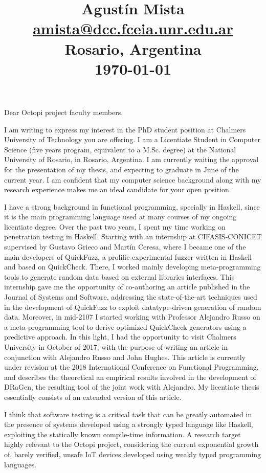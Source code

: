 \documentclass[helvetica,notitle,flagCMYK,totpages,11pt]{europecv}
\title{
  \begin{flushright}
    \Large{Agustín Mista}\\
    \small{\url{amista@dcc.fceia.unr.edu.ar}}\\
    \small{Rosario, Argentina}\\
    \small{\today}
  \end{flushright}
  \vspace{-50pt}
}
\date{}
\begin{document}
\maketitle 

Dear Octopi project faculty members,

I am writing to express my interest in the PhD student position at Chalmers
University of Technology you are offering.
%
I am a Licentiate Student in Computer Science (five years program, equivalent to
a M.Sc. degree) at the National University of Rosario, in Rosario, Argentina.
%
I am currently waiting the approval for the presentation of my thesis, and
expecting to graduate in June of the current year.
%
I am confident that my computer science background along with my research
experience makes me an ideal candidate for your open position.


I have a strong background in functional programming, specially in Haskell,
since it is the main programming language used at many courses of my ongoing
licentiate degree.
%
Over the past two years, I spent my time working on penetration testing in
Haskell. Starting with an internship at CIFASIS-CONICET supervised by Gustavo
Grieco and Martín Ceresa, where I became one of the main developers of
QuickFuzz, a prolific experimental fuzzer written in Haskell and based on
QuickCheck.
%
There, I worked mainly developing meta-programming tools to generate random data
based on external libraries interfaces.
%
This internship gave me the opportunity of co-authoring an article published in
the Journal of Systems and Software, addressing the state-of-the-art techniques
used in the development of QuickFuzz to exploit datatype-driven generation of
random data.
%
Moreover, in mid-2107 I started working with Professor Alejandro Russo on a
meta-programming tool to derive optimized QuickCheck generators using a
predictive approach.
%
In this light, I had the opportunity to visit Chalmers University in October of
2017, with the purpose of writing an article in conjunction with Alejandro Russo
and John Hughes.
%
This article is currently under revision at the 2018 International Conference on
Functional Programming, and describes the theoretical an empirical results
involved in the development of DRaGen, the resulting tool of the joint work with
Alejandro.
%
My licentiate thesis essentially consists of an extended version of this
article.


I think that software testing is a critical task that can be greatly automated
in the presence of systems developed using a strongly typed language like
Haskell, exploiting the statically known compile-time information.
%
A research target highly relevant to the Octopi project, considering the current
exponential growth of, barely verified, unsafe IoT devices developed using
weakly typed programming languages.
\end{document}
